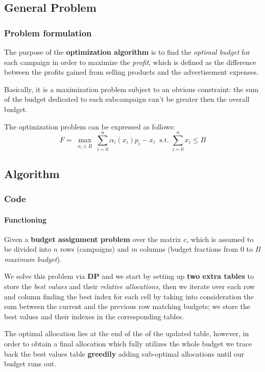 
\subsection{General Problem}


\begin{frame}

\frametitle{Problem formulation}

The purpose of the \textbf{optimization algorithm} is to find the \textit{optimal budget} for each campaign in order to maximize the \textit{profit}, which is defined as the difference between the profits gained from selling products and the advertisement expenses.

Basically, it is a maximization problem subject to an obvious constraint: the sum of the budget dedicated to each subcampaign can't be greater then the overall budget.

The optimization problem can be expressed as follows:
\begin{displaymath}
	F=\max_{\substack{x_i\in B}} \sum_{i=0}^n \alpha_i(x_i)p_i-x_i ~\text{  s.t.  } \sum_{i=0}^n x_i\leq B
\end{displaymath}

\end{frame}


\subsection{Algorithm}


\begin{frame}

\frametitle{Code}
\framesubtitle{Functioning}

\vspace*{-1em}

Given a \textbf{budget assignment problem} over the matrix $c$, which is assumed to be divided into $n$ rows (campaigns) and $m$ columns (budget fractions from 0 to $B$ \textit{maximum budget}).

We solve this problem via \textbf{DP} and we start by setting up \textbf{two extra tables} to store the \textit{best values} and their \textit{relative allocations}, then we iterate over each row and column finding the best index for each cell by taking into consideration the sum between the current and the previous row matching budgets; we store the best values and their indexes in the corresponding tables.

The optimal allocation lies at the end of the of the updated table, however, in order to obtain a final allocation which fully utilizes the whole budget we trace back the best values table \textbf{greedily} adding sub-optimal allocations until our budget runs out.

\end{frame}

